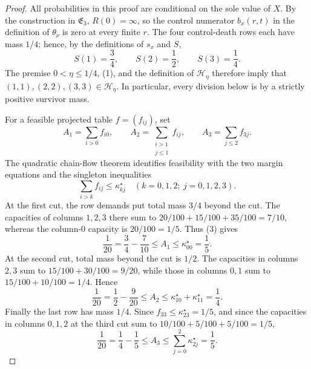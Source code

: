 \documentclass{article}
\begin{document}
\begin{proof}
All probabilities in this proof are conditional on the sole value of \(X\).  By the construction in \(\mathfrak E_3\), \(R(0)=\infty\), so the control numerator \(b_x(r,t)\) in the definition of \(\theta_\nu\) is zero at every finite \(r\).  The four control-death rows each have mass \(1/4\); hence, by the definitions of \(s_x\) and \(S\),
\[
 S(1)=\frac34,\qquad S(2)=\frac12,\qquad S(3)=\frac14. \tag{1}
\]
The premise \(0<\eta\leq 1/4\), (1), and the definition of \(\mathcal H_\eta\) therefore imply that \((1,1),(2,2),(3,3)\in\mathcal H_\eta\).  In particular, every division below is by a strictly positive survivor mass.

For a feasible projected table \(f=(f_{ij})\), set
\[
 A_1=\sum_{i>0}f_{i0},\qquad
 A_2=\sum_{\substack{i>1\\ j\leq1}}f_{ij},\qquad
 A_3=\sum_{j\leq2}f_{3j}. \tag{2}
\]
The quadratic chain-flow theorem identifies feasibility with the two margin equations and the singleton inequalities
\[
 \sum_{i>k}f_{ij}\leq\kappa^\star_{kj}\quad(k=0,1,2;\ j=0,1,2,3). \tag{3}
\]
At the first cut, the row demands put total mass \(3/4\) beyond the cut.  The capacities of columns \(1,2,3\) there sum to \(20/100+15/100+35/100=7/10\), whereas the column-\(0\) capacity is \(20/100=1/5\).  Thus (3) gives
\[
 \frac1{20}=\frac34-\frac7{10}\leq A_1\leq\kappa^\star_{00}=\frac15. \tag{4}
\]
At the second cut, total mass beyond the cut is \(1/2\).  The capacities in columns \(2,3\) sum to \(15/100+30/100=9/20\), while those in columns \(0,1\) sum to \(15/100+10/100=1/4\).  Hence
\[
 \frac1{20}=\frac12-\frac9{20}\leq A_2
 \leq\kappa^\star_{10}+\kappa^\star_{11}=\frac14. \tag{5}
\]
Finally the last row has mass \(1/4\).  Since \(f_{33}\leq\kappa^\star_{23}=1/5\), and since the capacities in columns \(0,1,2\) at the third cut sum to \(10/100+5/100+5/100=1/5\),
\[
 \frac1{20}=\frac14-\frac15\leq A_3
 \leq\sum_{j=0}^2\kappa^\star_{2j}=\frac15. \tag{6}
\]


\end{proof}
\end{document}
